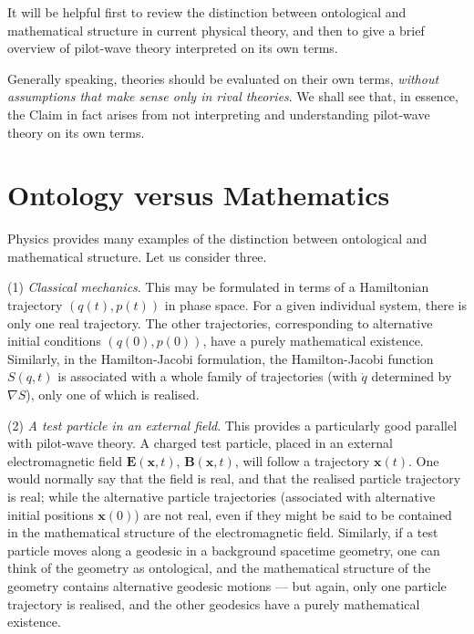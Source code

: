 \documentclass{article}%
\begin{document}
It will be helpful first to review the distinction between ontological and
mathematical structure in current physical theory, and then to give a brief
overview of pilot-wave theory interpreted on its own terms.

Generally speaking, theories should be evaluated on their own terms,
\textit{without assumptions that make sense only in rival theories}. We shall
see that, in essence, the Claim in fact arises from not interpreting and
understanding pilot-wave theory on its own terms.

\section{Ontology versus Mathematics}

Physics provides many examples of the distinction between ontological and
mathematical structure. Let us consider three.

(1)\textit{ Classical mechanics}. This may be formulated in terms of a
Hamiltonian trajectory $(q(t),p(t))$ in phase space. For a given individual
system, there is only one real trajectory. The other trajectories,
corresponding to alternative initial conditions $(q(0),p(0))$, have a purely
mathematical existence. Similarly, in the Hamilton-Jacobi formulation, the
Hamilton-Jacobi function $S(q,t)$ is associated with a whole family of
trajectories (with $\dot{q}$ determined by $\nabla S$), only one of which is realised.

(2) \textit{A test particle in an external field}. This provides a
particularly good parallel with pilot-wave theory. A charged test particle,
placed in an external electromagnetic field $\mathbf{E}(\mathbf{x},t)$,
$\mathbf{B}(\mathbf{x},t)$, will follow a trajectory $\mathbf{x}(t)$. One
would normally say that the field is real, and that the realised particle
trajectory is real; while the alternative particle trajectories (associated
with alternative initial positions $\mathbf{x}(0)$) are not real, even if they
might be said to be contained in the mathematical structure of the
electromagnetic field. Similarly, if a test particle moves along a geodesic in
a background spacetime geometry, one can think of the geometry as ontological,
and the mathematical structure of the geometry contains alternative geodesic
motions --- but again, only one particle trajectory is realised, and the other
geodesics have a purely mathematical existence.
\end{document}
